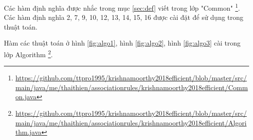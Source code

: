 Các hàm định nghĩa được nhắc trong mục \ref{sec:def} viết trong lớp "Common" \footnote{\url{https://github.com/ttpro1995/krishnamoorthy2018efficient/blob/master/src/main/java/me/thaithien/associationrules/krishnamoorthy2018efficient/Common.java}}. Các hàm định nghĩa 2, 7, 9, 10, 12, 13, 14, 15, 16 được cài đặt để sử dụng trong thuật toán. 

Hàm các thuật toán ở hình \ref{fig:algo1}, hình \ref{fig:algo2}, hình \ref{fig:algo3} cài trong lớp Algorithm \footnote{\url{https://github.com/ttpro1995/krishnamoorthy2018efficient/blob/master/src/main/java/me/thaithien/associationrules/krishnamoorthy2018efficient/Algorithm.java}}. 























